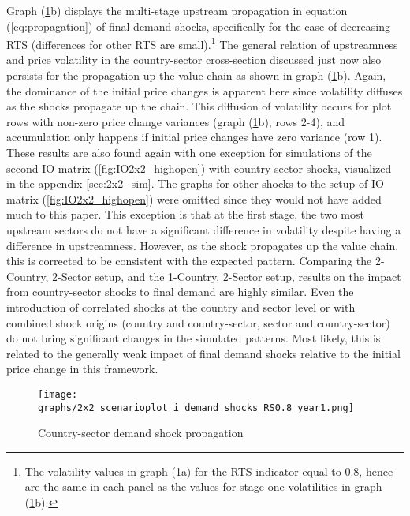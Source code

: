 Graph (\ref{fig:2x2demand_i_y1}b) displays the multi-stage upstream propagation in equation (\ref{eq:propagation}) of final demand shocks, 
specifically for the case of decreasing RTS (differences for other RTS are small).\footnote{The volatility values in graph (\ref{fig:2x2demand_i_y1}a) 
for the RTS indicator equal to 0.8, hence are the same in each panel as the values for stage one volatilities in graph (\ref{fig:2x2demand_i_y1}b).}
The general relation of upstreamness and price volatility in the 
country-sector cross-section discussed just now also persists for the propagation up the value chain as shown in graph (\ref{fig:2x2demand_i_y1}b). 
Again, the dominance of the initial price changes is apparent here since volatility diffuses as the shocks propagate up the chain. This 
diffusion of volatility occurs for plot rows with non-zero price change variances (graph (\ref{fig:2x2demand_i_y1}b), rows 2-4), and 
accumulation only happens if initial price changes have zero variance (row 1). These results are also found again with one exception 
for simulations of the second IO matrix (\ref{fig:IO2x2_highopen}) with country-sector shocks, visualized in the appendix \ref{sec:2x2_sim}. 
The graphs for other shocks to the setup of IO matrix (\ref{fig:IO2x2_highopen}) were omitted since they would not have added much to this paper.
This exception is that at the first stage, the two most upstream sectors do not have a significant difference in volatility despite 
having a difference in upstreamness. However, as the shock propagates up the value chain, this is corrected to be consistent with the 
expected pattern. Comparing the 2-Country, 2-Sector setup, and the 1-Country, 2-Sector setup, results on the impact from country-sector shocks to 
final demand are highly similar. Even the introduction of correlated shocks at the country and sector level or with combined shock 
origins (country and country-sector, sector and country-sector) do not bring significant changes in the simulated patterns. Most likely, 
this is related to the generally weak impact of final demand shocks relative to the initial price change in this framework.


\begin{figure}[H]
    \texttt{[image: graphs/2x2\_scenarioplot\_i\_demand\_shocks\_RS0.8\_year1.png]}
    \caption{\label{fig:2x2demand_i_y1} Country-sector demand shock propagation}
\end{figure}


